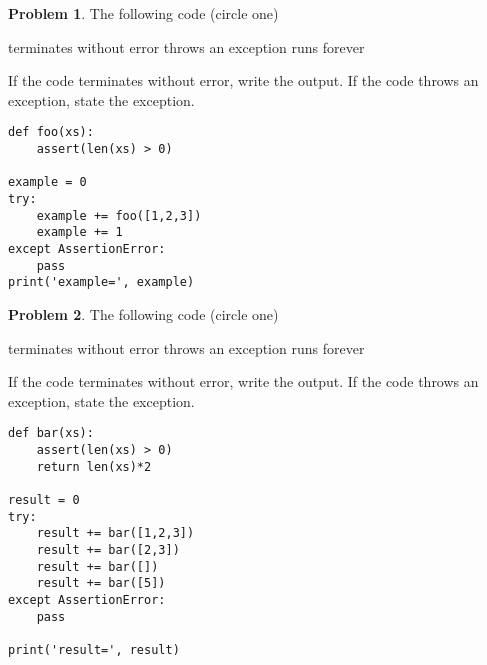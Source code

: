 \documentclass[10pt]{article}
\theoremstyle{definition}
\newtheorem{problem}{Problem}
\begin{document}
\begin{problem}
    The following code (circle one)

    \vspace{0.25in}
    \hspace{0.5in}terminates without error 
    \hspace{1in}throws an exception
    \hspace{1in}runs forever
    \vspace{0.25in}

    \noindent
    If the code terminates without error, write the output.
    If the code throws an exception, state the exception.
\end{problem}
\begin{lstlisting}
def foo(xs):
    assert(len(xs) > 0)

example = 0
try:
    example += foo([1,2,3])
    example += 1
except AssertionError:
    pass
print('example=', example)
\end{lstlisting}
\vspace{0.75in}

\begin{problem}
    The following code (circle one)

    \vspace{0.25in}
    \hspace{0.5in}terminates without error 
    \hspace{1in}throws an exception
    \hspace{1in}runs forever
    \vspace{0.25in}

    \noindent
    If the code terminates without error, write the output.
    If the code throws an exception, state the exception.
\end{problem}
\begin{lstlisting}
def bar(xs):
    assert(len(xs) > 0)
    return len(xs)*2

result = 0
try:
    result += bar([1,2,3])
    result += bar([2,3])
    result += bar([])
    result += bar([5])
except AssertionError:
    pass

print('result=', result)
\end{lstlisting}
\vspace{0.75in}
\end{document}
